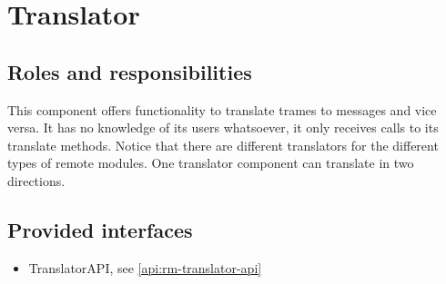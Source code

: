 \section{Translator}
\label{element:rm-translator}

\subsection{Roles and responsibilities}

\npar This component offers functionality to translate trames to messages and
vice versa. It has no knowledge of its users whatsoever, it only receives calls
to its translate methods. Notice that there are different translators for the
different types of remote modules. One translator component can translate in two
directions.

\subsection{Provided interfaces}

\begin{itemize}
  \item TranslatorAPI, see \ref{api:rm-translator-api}
\end{itemize}